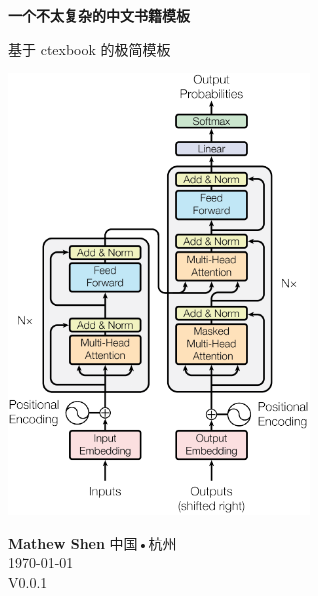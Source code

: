 \documentclass{ctexbook}
\begin{document}
\frontmatter
\begin{titlepage}
    \begin{center}
        \vspace*{1cm}
 
        \textbf{一个不太复杂的中文书籍模板}
 
        \vspace{0.5cm}
         基于 ctexbook 的极简模板
             
        \vspace{0.5cm}

        \includegraphics[width=0.6\textwidth]{./figures/transformer.pdf}

        \vfill

        \vspace{1cm}
        \textbf{Mathew Shen}
        中国•杭州\\
        \today \\
         V0.0.1

    \end{center}
 \end{titlepage}


\tableofcontents
\setcounter{tocdepth}{2}




\mainmatter






\backmatter




\printbibliography[title={参考文献}, heading=bibintoc]

\printindex

\end{document}
